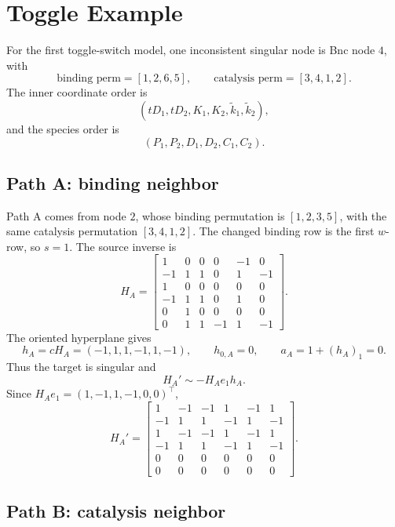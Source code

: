 \documentclass[11pt]{article}
\begin{document}
\section{Toggle Example}

For the first toggle-switch model, one inconsistent singular node is Bnc node
\(4\), with
\[
    \text{binding perm}=[1,2,6,5],
    \qquad
    \text{catalysis perm}=[3,4,1,2].
\]
The inner coordinate order is
\[
    (tD_1,tD_2,K_1,K_2,\tilde k_1,\tilde k_2),
\]
and the species order is
\[
    (P_1,P_2,D_1,D_2,C_1,C_2).
\]

\subsection*{Path A: binding neighbor}

Path A comes from node \(2\), whose binding permutation is
\([1,2,3,5]\), with the same catalysis permutation \([3,4,1,2]\).  The changed
binding row is the first \(w\)-row, so \(s=1\).  The source inverse is
\[
H_A=
\begin{bmatrix}
 1&0&0&0&-1&0\\
-1&1&1&0&1&-1\\
 1&0&0&0&0&0\\
-1&1&1&0&1&0\\
 0&1&0&0&0&0\\
 0&1&1&-1&1&-1
\end{bmatrix}.
\]
The oriented hyperplane gives
\[
    h_A=cH_A=(-1,1,1,-1,1,-1),
    \qquad
    h_{0,A}=0,
    \qquad
    a_A=1+(h_A)_1=0.
\]
Thus the target is singular and
\[
    H_A'\sim -H_Ae_1h_A.
\]
Since \(H_Ae_1=(1,-1,1,-1,0,0)^\top\),
\[
H_A'=
\begin{bmatrix}
 1&-1&-1&1&-1&1\\
-1&1&1&-1&1&-1\\
 1&-1&-1&1&-1&1\\
-1&1&1&-1&1&-1\\
 0&0&0&0&0&0\\
 0&0&0&0&0&0
\end{bmatrix}.
\]

\subsection*{Path B: catalysis neighbor}
\end{document}
